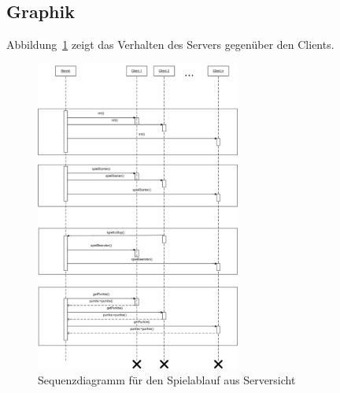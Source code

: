 \subsection{Graphik}

Abbildung~\ref{SequenzdiagramServer} zeigt das Verhalten des Servers gegenüber den Clients. 

 \begin{figure}[hbt]
  \centering
  \includegraphics[width=0.60\textwidth,angle=0]{graphics/Spielablauf_Sequenzdiagramm.png}
  \caption{Sequenzdiagramm für den Spielablauf aus Serversicht \hfill{} }
  \label{SequenzdiagramServer}
 \end{figure}

